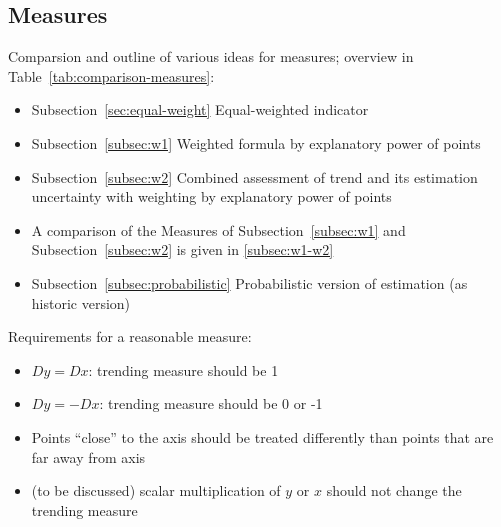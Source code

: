 \documentclass[oneside]{article}
\theoremstyle{plain}%
\theoremstyle{definition}
\newcommand{\ydiff}{D y}
\newcommand{\xdiff}{Dx}
\begin{document}
\subsection{Measures}

Comparsion and outline of various ideas for measures; overview in Table~\ref{tab:comparison-measures}:
\begin{itemize}
    \item Subsection~\ref{sec:equal-weight} Equal-weighted indicator
    \item Subsection~\ref{subsec:w1} Weighted formula by explanatory power of points
    \item Subsection~\ref{subsec:w2} Combined assessment of trend and its estimation uncertainty with weighting by explanatory power of points
    \item A comparison of the Measures of Subsection~\ref{subsec:w1} and Subsection~\ref{subsec:w2} is given in \ref{subsec:w1-w2}
    \item Subsection~\ref{subsec:probabilistic} Probabilistic version of estimation (as historic version)
\end{itemize}

Requirements for a reasonable measure:
\begin{itemize}
    \item $\ydiff = \xdiff$: trending measure should be 1
    \item $\ydiff = - \xdiff$: trending measure should be 0 or -1
    \item Points \enquote{close} to the axis should be treated differently than points that are far away from axis
    \item (to be discussed) scalar multiplication of $y$ or $x$ should not change the trending measure
\end{itemize}

\end{document}
